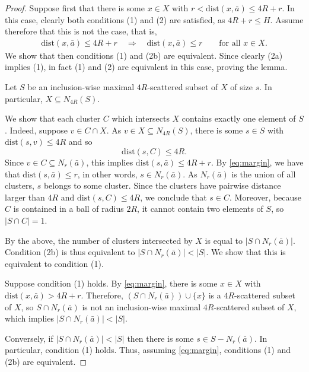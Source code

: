 \documentclass[11pt]{article}
\theoremstyle{remark}
\newcommand{\set}[1]{\{#1\}}
\renewcommand{\subset}{\subseteq}
\renewcommand{\le}{\leqslant}
\newcommand{\dist}{\mathrm{dist}}
\newcommand{\tup}{\bar}
\begin{document}
\begin{proof}
    Suppose first that
there is some $x\in X$ with $r<\dist(x,\bar a)\le 4R+r$.
In this case, clearly both conditions (1) and (2) are satisfied,
as $4R+r\le H$.
Assume therefore that this is not the case, that is,
 \begin{align}\label{eq:margin}
\dist(x,\tup a)\le 4R+r \quad\Longrightarrow\quad \dist(x,\tup a)\le  r\qquad\text{for all $x\in X$.}
 \end{align}
We show that then conditions (1) and (2b) are equivalent.
Since clearly (2a) implies (1), in fact (1) and (2) are equivalent in this case, proving the lemma.





Let $S$ be an inclusion-wise maximal $4R$-scattered subset of $X$ of size $s$.
In particular, $X\subseteq N_{4R}(S)$.

We show that each cluster $C$ which intersects $X$ contains exactly one element of $S$.
Indeed, suppose $v\in C\cap X$. As $v\in X\subseteq N_{4R}(S)$,
there is some $s\in S$ with $\dist(s,v)\le 4R$ and so $$\dist(s,C)\le 4R.$$
Since $v\in C\subset N_r(\bar a)$,
this
  implies $\dist(s,\bar a)\le 4R+r$.
  By \eqref{eq:margin}, we have that $\dist(s,\bar a)\le r$, in other words, $s\in N_r(\bar a)$.
  As $N_r(\bar a)$ is the union of all clusters,
   $s$ belongs to some cluster.
  Since the clusters have pairwise distance larger than $4R$ and $\dist(s,C)\le 4R$,
  we conclude that $s\in C$.
  Moreover, because $C$ is contained in a ball of radius $2R$, it cannot contain two elements of $S$, so $|S\cap C|=1$.

  By the above,
the number of
  clusters intersected by $X$ is equal to  $|S\cap N_r(\bar a)|$.
Condition (2b) is thus equivalent to $|S\cap N_r(\bar a)|<|S|$. We show that this is equivalent to condition (1).

Suppose
condition (1) holds. By \eqref{eq:margin},
there is
some $x\in X$ with $\dist(x,\bar a)>4R+r$.
Therefore,
$(S\cap N_r(\bar a))\cup \set{x}$
is a $4R$-scattered subset of $X$,
so $S\cap N_r(\bar a)$ is not an inclusion-wise maximal $4R$-scattered subset of $X$,
which implies $|S\cap N_r(\bar a)|<|S|$.

Conversely, if $|S\cap N_r(\bar a)|<|S|$ then
 there is some
$s\in S-  N_r(\bar a)$.
In particular, condition (1) holds.
Thus, assuming \eqref{eq:margin},
conditions (1) and (2b) are equivalent.
\end{proof}
\end{document}

